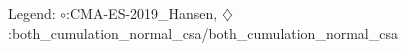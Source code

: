 Legend: {\color{CornflowerBlue}$\circ$}:CMA-ES-2019\_Hansen, {\color{Orange}$\diamondsuit$}:both\_cumulation\_normal\_csa/both\_cumulation\_normal\_csa